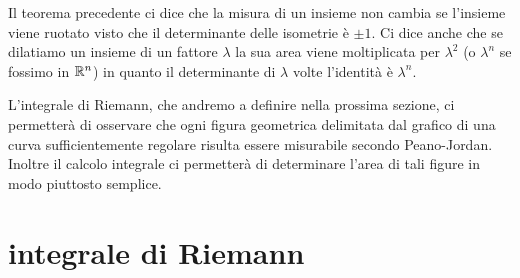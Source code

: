 Il teorema precedente ci dice che la misura di un 
insieme non cambia se l'insieme viene ruotato
visto che il determinante delle isometrie è $\pm 1$. 
Ci dice anche che se dilatiamo un insieme di un fattore $\lambda$
la sua area viene moltiplicata per $\lambda^2$ 
(o $\lambda^n$ se fossimo in ${\mathbb R}^n$) in quanto 
il determinante di $\lambda$ volte l'identità
è $\lambda^n$.

% 
% 
% 

L'integrale di Riemann, che andremo a definire
nella prossima sezione, ci permetterà di osservare che ogni figura geometrica
delimitata dal grafico di una curva sufficientemente regolare risulta
essere misurabile secondo Peano-Jordan. 
Inoltre il calcolo integrale ci permetterà
di determinare l'area di tali figure in modo piuttosto semplice.

\section{integrale di Riemann}

